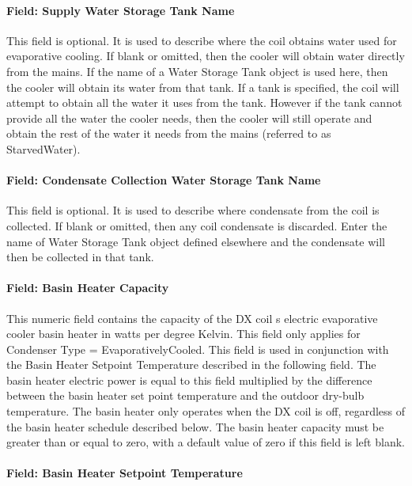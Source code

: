 \paragraph{Field: Supply Water Storage Tank Name}\label{field-supply-water-storage-tank-name-2-000}

This field is optional. It is used to describe where the coil obtains water used for evaporative cooling. If blank or omitted, then the cooler will obtain water directly from the mains. If the name of a Water Storage Tank object is used here, then the cooler will obtain its water from that tank. If a tank is specified, the coil will attempt to obtain all the water it uses from the tank. However if the tank cannot provide all the water the cooler needs, then the cooler will still operate and obtain the rest of the water it needs from the mains (referred to as StarvedWater).

\paragraph{Field: Condensate Collection Water Storage Tank Name}\label{field-condensate-collection-water-storage-tank-name-4}

This field is optional. It is used to describe where condensate from the coil is collected. If blank or omitted, then any coil condensate is discarded. Enter the name of Water Storage Tank object defined elsewhere and the condensate will then be collected in that tank.

\paragraph{Field: Basin Heater Capacity}\label{field-basin-heater-capacity-2-000}

This numeric field contains the capacity of the DX coil s electric evaporative cooler basin heater in watts per degree Kelvin. This field only applies for Condenser Type = EvaporativelyCooled. This field is used in conjunction with the Basin Heater Setpoint Temperature described in the following field. The basin heater electric power is equal to this field multiplied by the difference between the basin heater set point temperature and the outdoor dry-bulb temperature. The basin heater only operates when the DX coil is off, regardless of the basin heater schedule described below. The basin heater capacity must be greater than or equal to zero, with a default value of zero if this field is left blank.

\paragraph{Field: Basin Heater Setpoint Temperature}\label{field-basin-heater-setpoint-temperature-2-000}

